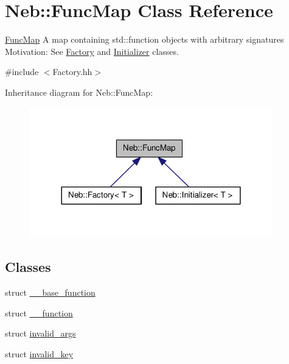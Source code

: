 \hypertarget{classNeb_1_1FuncMap}{\section{\-Neb\-:\-:\-Func\-Map \-Class \-Reference}
\label{classNeb_1_1FuncMap}
}


\hyperlink{classNeb_1_1FuncMap}{\-Func\-Map} \-A map containing {\ttfamily std\-::function} objects with arbitrary signatures \-Motivation\-: \-See \hyperlink{classNeb_1_1Factory}{\-Factory} and \hyperlink{classNeb_1_1Initializer}{\-Initializer} classes.  




{\ttfamily \#include $<$\-Factory.\-hh$>$}



\-Inheritance diagram for \-Neb\-:\-:\-Func\-Map\-:\nopagebreak
\begin{figure}[H]
\begin{center}
\leavevmode
\includegraphics[width=300pt]{classNeb_1_1FuncMap__inherit__graph}
\end{center}
\end{figure}
\subsection*{\-Classes}
\begin{DoxyCompactItemize}
\item 
struct \hyperlink{structNeb_1_1FuncMap_1_1____base__function}{\-\_\-\-\_\-base\-\_\-function}
\item 
struct \hyperlink{structNeb_1_1FuncMap_1_1____function}{\-\_\-\-\_\-function}
\item 
struct \hyperlink{structNeb_1_1FuncMap_1_1invalid__args}{invalid\-\_\-args}
\item 
struct \hyperlink{structNeb_1_1FuncMap_1_1invalid__key}{invalid\-\_\-key}
\end{DoxyCompactItemize}
